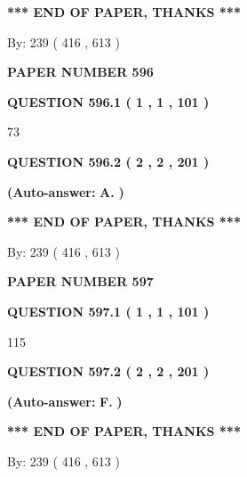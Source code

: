 \documentclass{ctexart}
\begin{document}
 
   
   
   
   
\vspace{1.0in} 
{\textbf{\large{ *** END OF PAPER, THANKS *** }}} 
   
   
\hspace{1.0in} By: 
 239 ( 416 ,  613 )
   
   
   
   
\newpage 
\setcounter{page}{ 
   596001 } 
   
   
 {\textbf{ \Large{ PAPER NUMBER  596  }}}
   
   
   
   
  
  
{\textbf{\large{QUESTION
596.1 
 ( 1 , 1 , 101 )
}}}

73
  
  
{\textbf{\large{QUESTION
596.2 
 ( 2 , 2 , 201 )
}}}
 
 
{\textbf{(Auto-answer:}}
{\textbf{\large{
A.}}}
{\textbf{)}}
 
 
   
   
   
   
\vspace{1.0in} 
{\textbf{\large{ *** END OF PAPER, THANKS *** }}} 
   
   
\hspace{1.0in} By: 
 239 ( 416 ,  613 )
   
   
   
   
\newpage 
\setcounter{page}{ 
   597001 } 
   
   
 {\textbf{ \Large{ PAPER NUMBER  597  }}}
   
   
   
   
  
  
{\textbf{\large{QUESTION
597.1 
 ( 1 , 1 , 101 )
}}}

115
  
  
{\textbf{\large{QUESTION
597.2 
 ( 2 , 2 , 201 )
}}}
 
 
{\textbf{(Auto-answer:}}
{\textbf{\large{
F.}}}
{\textbf{)}}
 
 
   
   
   
   
\vspace{1.0in} 
{\textbf{\large{ *** END OF PAPER, THANKS *** }}} 
   
   
\hspace{1.0in} By: 
 239 ( 416 ,  613 )
   
   
   
   
\newpage 
\setcounter{page}{ 
   598001 } 
   
\end{document}
